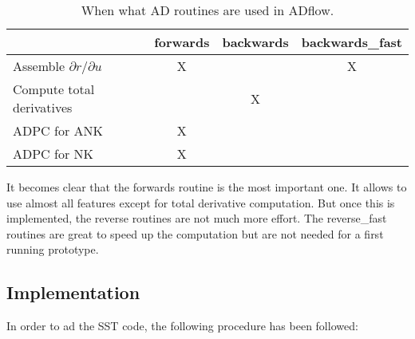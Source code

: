 \begin{table}[H]
    \centering
    \begin{tabular}{l c c c}
        \toprule
                                            & forwards  & backwards     & 
                                            backwards\_fast \\
        \midrule
        Assemble $\partial r / \partial u$  &  X        &               & X \\ 
        Compute total derivatives           &           & X             &   \\
        ADPC for ANK                        &  X        &               &   \\
        ADPC for NK                         &  X        &               &   \\
        \bottomrule
    \end{tabular}
    \caption{When what AD routines are used in ADflow.}
    \label{tab:ad_routines}
\end{table}

\noindent It becomes clear that the forwards routine is the most important one.
It allows to use almost all features except for total derivative computation.
But once this is implemented, the reverse routines are not much more effort.
The reverse\_fast routines are great to speed up the computation but are not
needed for a first running prototype.




\subsection{Implementation}
In order to ad the SST code, the following procedure has been followed:

